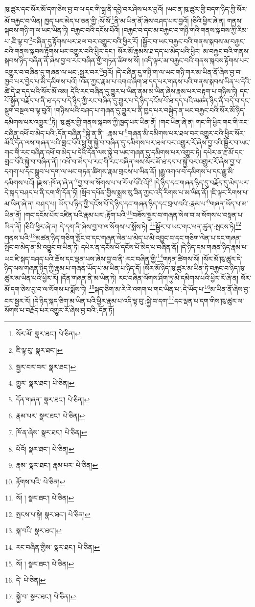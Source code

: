ཁུ་ཚུར་དང་སོར་མོ་དག་ཅེས་བྱ་བ་ལ་དང་གི་སྒྲ་ནི་དབྱེ་བར་ཤེས་པར་བྱའོ། །ཡང་ན་ཁུ་ཚུར་གྱི་བདག་ཉིད་ཀྱི་སོར་མོ་བརྐྱང་བ་ཡིན། ཁྱད་པར་མེད་པ་ཅན་གྱི་:སོ་སོ་\footnote{སོར་མོ་  སྣར་ཐང་།  པེ་ཅིན། }ནི་མ་ཡིན་ནོ་ཞེས་བཤད་པར་བྱའོ། །ཅིའི་ཕྱིར་ཞེ་ན། གནས་སྐབས་གཉི་ག་ལ་ཡང་ཡིན་ཏེ། བརྐྱང་བའི་དངོས་པོའོ། །བརྐྱང་བ་དང་མ་བརྐྱང་བ་གཉི་གའི་གནས་སྐབས་ཀྱི་རིམ་པ་:ཇི་ལྟ་བ་\footnote{ཇི་ལྟ་བུ་  སྣར་ཐང་། }བཞིན་དུ་རྟོགས་པར་ཐལ་བར་འགྱུར་བའི་ཕྱིར་རོ། །སྦྱོར་བ་ཡང་བརྐྱང་བའི་གནས་སྐབས་མ་བརྐྱང་བའི་གནས་སྐབས་རྟོགས་པར་འགྱུར་བའི་ཕྱིར་དང་། སོར་མོ་རྣམས་ཐ་དད་པ་མེད་པའི་ཕྱིར། མ་བརྐྱང་བའི་གནས་སྐབས་ཉིད་བཞིན་ནོ་ཞེས་བྱ་བ་རང་བཞིན་གྱི་གཏན་ཚིགས་སོ། །འདི་ལྟར་མ་བརྐྱང་བའི་གནས་སྐབས་རྟོགས་པར་འགྱུར་བ་བཞིན་དུ་གཞན་ལ་ཡང་:སྦྱར་བར་\footnote{སྦྱར་བར་བར་  སྣར་ཐང་། }བྱའོ། །དེ་བཞིན་དུ་གཉི་ག་ལ་ཡང་གཉི་གར་མ་ཡིན་ནོ་ཞེས་བྱ་བ་ཁྱབ་པར་བྱེད་པ་མི་དམིགས་པའོ། །འོན་ཀྱང་རྣམ་པ་འགའ་ཞིག་ཐ་དད་པར་གནས་པའི་གནས་སྐབས་ཡིན་པ་དེའི་ཚེ་དེ་ཐ་དད་པའི་སོར་མོ་འམ། དེའི་རང་བཞིན་དུ་གྱུར་པ་ཡིན་ནམ་མ་ཡིན་ཞེས་རྣམ་པར་བརྟག་པ་གཉིས་ཏེ། དང་པོ་སྐྱོན་བརྗོད་པ་ནི་ཐ་དད་པ་དེ་ཉིད་ཀྱི་རང་བཞིན་དུ་གྱུར་པ་དེ་ཉིད་དངོས་པོ་ཐ་དད་པའི་མཚན་ཉིད་ནི་བདེ་བ་དང་སྡུག་བསྔལ་བ་ལྟ་བུའོ། །གཉིས་པའི་བཤད་པ་གཞན་དུ་གྱུར་པ་ནི་ཁྱད་པར་བསྐྱེད་ན་ཡང་བརྐྱང་བའི་སོར་མོ་ཉིད་དམིགས་པར་འགྱུར་\footnote{གྱུར་  སྣར་ཐང་།  པེ་ཅིན། }ཏེ། ཁུ་ཚུར་གྱི་གནས་སྐབས་ཀྱི་ཁྱད་པར་ཡིན་ནོ། །གང་ཡིན་ཞེ་ན། གང་གི་ཕྱིར་གང་གི་རང་བཞིན་འཕོ་བ་མེད་པའི་:དོན་བཞིན་\footnote{དོན་གཞན་  སྣར་ཐང་།  པེ་ཅིན། }སྐྱེ་ན་ནི། :རྣམ་པ་\footnote{རྣམ་པར་  སྣར་ཐང་།  པེ་ཅིན། }གཞན་མི་དམིགས་པར་ཐལ་བར་འགྱུར་བའི་ཕྱིར་སོར་མོའི་དོན་ལས་གཞན་པའི་གླང་པོའི་ཕྲུ་གུ་སྐྱེ་བ་བཞིན་དུ་དམིགས་པར་ཐལ་བར་འགྱུར་རོ་ཞེས་བྱ་བའི་སྦྱོར་བ་ཡང་གང་གི་རང་བཞིན་འཕོ་བ་མེད་པ་དེའི་དོན་ལས་སྐྱེ་བ་ཡང་གཞན་དུ་དམིགས་པར་འགྱུར་ཏེ། དཔེར་ན་རྔ་མོ་དང་གླང་པོའི་སྐྱེ་བ་བཞིན་ནོ། །འཕོ་བ་མེད་པ་རང་གི་རང་བཞིན་ལས་སོར་མོ་ཐ་དད་པ་སྐྱེ་བར་འགྱུར་རོ་ཞེས་བྱ་བ་དགག་པ་དང་སྒྲུབ་པ་དག་ལ་ཡང་གཏན་ཚིགས་རྣམ་གྲངས་པ་ཡིན་ནོ། །རྒྱུ་འགལ་བ་དམིགས་པ་དང་རྒྱུ་མི་དམིགས་པའོ། །རྫས་:ཁོ་ན་ཞེ་ན་\footnote{ཁོ་ན་ཞེས་  སྣར་ཐང་།  པེ་ཅིན། }བྱ་བ་ལ་སོགས་པ་ཕ་རོལ་པོའི་འོ།\footnote{པོའོ།  སྣར་ཐང་།  པེ་ཅིན། } །དེ་ཉིད་དང་གཞན་ཉིད་དུ་བརྗོད་དུ་མེད་པར་དེ་སྐད་བཤད་པ་ནི་ངག་གི་དོན་ཏོ། །སློབ་དཔོན་གྱིས་སྨྲས་སུ་ཟིན་ཀྱང་འདི་རིགས་པ་མ་ཡིན་ནོ། །ཇི་ལྟར་རིགས་པ་མ་ཡིན་ཞེ་ན། བཤད་པ། ཡོད་པ་ཉིད་ཀྱི་དངོས་པོ་དེ་ཉིད་དང་གཞན་ཉིད་དང་བྲལ་བའི་:རྣམ་པ་\footnote{རྣམ་  སྣར་ཐང་། རྣམ་པར་  པེ་ཅིན། }གཞན་ཡོད་པ་མ་ཡིན་ནོ། །གང་དངོས་པོར་འཛིན་པའི་རྣམ་པར་:རྟོག་པའི་\footnote{རྟོགས་པའི་  པེ་ཅིན། }བཟོས་སྦྱར་བ་གཞན་སེལ་བ་ལ་སོགས་པ་བསྟན་པ་ཡིན་ནོ། །ཅིའི་ཕྱིར་ཞེ་ན། དེ་དག་ནི་ཞེས་བྱ་བ་ལ་སོགས་པ་སྨོས་ཏེ། \footnote{སོ། །   སྣར་ཐང་།  པེ་ཅིན། }སྦྱོར་བ་ཡང་གང་ཕན་ཚུན་:སྤངས་ཏེ།\footnote{སྤངས་པ་སྟེ།  སྣར་ཐང་།  པེ་ཅིན། } གནས་པའི་\footnote{སྐ་བའི་  སྣར་ཐང་། }མཚན་ཉིད་གཅིག་སྤོང་བ་དང་གཞན་ལེན་པ་མེད་པ་མི་འབྱུང་བ་དང་གཅིག་ལེན་པ་དང་གཞན་སྤོང་བ་མེད་ན་མི་འབྱུང་བ་ཡིན་ཏེ། དཔེར་ན་དངོས་པོ་དངོས་པོ་མེད་པ་བཞིན་ནོ། །དེ་ཉིད་དམ་གཞན་ཉིད་རྣམ་པ་ཡང་ཇི་སྐད་བཤད་པའི་ཆོས་དང་ལྡན་པས་ཞེས་བྱ་བ་ནི་:རང་བཞིན་གྱི་\footnote{རང་བཞིན་གྱིས་  སྣར་ཐང་།  པེ་ཅིན། }གཏན་ཚིགས་སོ། །སོར་མོ་ཁུ་ཚུར་དེ་ཉིད་ལས་གཞན་ཉིད་ཀྱི་རྣམ་པ་གཞན་ཡོད་པ་མ་ཡིན་པ་ཉིད་དོ། །སོར་མོ་ཉིད་ཁུ་ཚུར་མ་ཡིན་ཏེ་བརྐྱང་བ་ཉིད་ཁུ་ཚུར་མ་ཡིན་པའི་ཕྱིར་རོ། །དོན་གཞན་ནི་མ་ཡིན་ཏེ། རང་བཞིན་ལོགས་ཤིག་ཏུ་མི་དམིགས་པའི་ཕྱིར་རོ་ཞེ་ན། སོར་མོ་དག་ཅེས་བྱ་བ་ལ་སོགས་པ་སྨོས་ཏེ། \footnote{སོ། །   སྣར་ཐང་།  པེ་ཅིན། }སྐད་ཅིག་མ་རེ་རེ་འགག་པ་གང་ཡིན་པ་:དེ་ཡོད་པ་\footnote{དེ་  པེ་ཅིན། }མ་ཡིན་ནོ་ཞེས་བྱ་བར་སྦྱར་རོ། །དེ་ཉིད་སྐད་ཅིག་མ་ཡིན་པའི་ཕྱིར་རྣམ་པ་འདི་ལྟ་བུ་:སྐྱེ་བ་དག་\footnote{སྐྱེ་བ་  སྣར་ཐང་།  པེ་ཅིན། }དང་ལྡན་པ་དག་གིས་ཁུ་ཚུར་ལ་སོགས་པ་བརྗོད་པར་འགྱུར་རོ་ཞེས་བྱ་བའི་:དོན་ཏོ། 